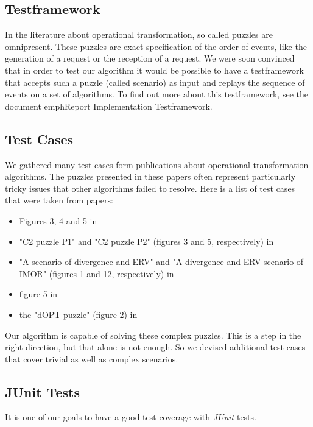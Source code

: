\subsection{Testframework}
In the literature about operational transformation, so called puzzles are omnipresent. These puzzles are exact specification of the order of events, like the generation of a request or the reception of a request. We were soon convinced that in order to test our algorithm it would be possible to have a testframework that accepts such a puzzle (called scenario) as input and replays the sequence of events on a set of algorithms. To find out more about this testframework, see the document emph{Report Implementation Testframework}.

\subsection{Test Cases}
We gathered many test cases form publications about operational transformation algorithms. The puzzles presented in these papers often represent particularly tricky issues that other algorithms failed to resolve. Here is a list of test cases that were taken from papers:

\begin{itemize}
 \item Figures 3, 4 and 5 in \cite{imine03b}
 \item "C2 puzzle P1" and "C2 puzzle P2" (figures 3 and 5, respectively) in \cite{imine04}
 \item "A scenario of divergence and ERV" and  "A divergence and ERV scenario of IMOR" (figures 1 and 12, respectively) in \cite{li04}
 \item figure 5 in \cite{suleiman98}
 \item the "dOPT puzzle" (figure 2) in \cite{sun98b} 
\end{itemize}

Our algorithm is capable of solving these complex puzzles. This is a step in the right direction, but that alone is not enough. So we devised additional test cases that cover trivial as well as complex scenarios.

\subsection{JUnit Tests}
It is one of our goals to have a good test coverage with \emph{JUnit} tests.
